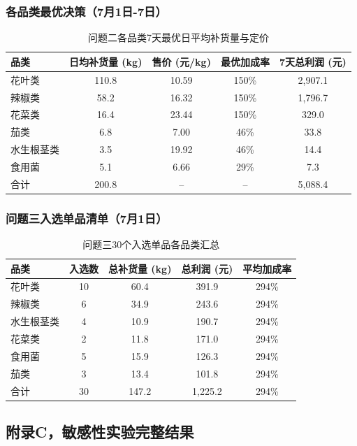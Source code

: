 \subsubsection{各品类最优决策（7月1日-7日）}

\begin{table}[H]
\centering
\caption{问题二各品类7天最优日平均补货量与定价}
\begin{tabular}{lcccc}
\hline
品类 & 日均补货量 (kg) & 售价 (元/kg) & 最优加成率 & 7天总利润 (元) \\
\hline
花叶类 & 110.8 & 10.59 & 150\% & 2,907.1 \\
辣椒类 & 58.2 & 16.32 & 150\% & 1,796.7 \\
花菜类 & 16.4 & 23.44 & 150\% & 329.0 \\
茄类 & 6.8 & 7.00 & 46\% & 33.8 \\
水生根茎类 & 3.5 & 19.92 & 46\% & 14.4 \\
食用菌 & 5.1 & 6.66 & 29\% & 7.3 \\
\hline
合计 & 200.8 & -- & -- & 5,088.4 \\
\hline
\end{tabular}
\end{table}

\subsubsection{问题三入选单品清单（7月1日）}

\begin{table}[H]
\centering
\caption{问题三30个入选单品各品类汇总}
\begin{tabular}{lcccc}
\hline
品类 & 入选数 & 总补货量 (kg) & 总利润 (元) & 平均加成率 \\
\hline
花叶类 & 10 & 60.4 & 391.9 & 294\% \\
辣椒类 & 6 & 34.9 & 243.6 & 294\% \\
水生根茎类 & 4 & 10.9 & 190.7 & 294\% \\
花菜类 & 2 & 11.8 & 171.0 & 294\% \\
食用菌 & 5 & 15.9 & 126.3 & 294\% \\
茄类 & 3 & 13.4 & 101.8 & 294\% \\
\hline
合计 & 30 & 147.2 & 1,225.2 & 294\% \\
\hline
\end{tabular}
\end{table}

\subsection{附录C，敏感性实验完整结果}


